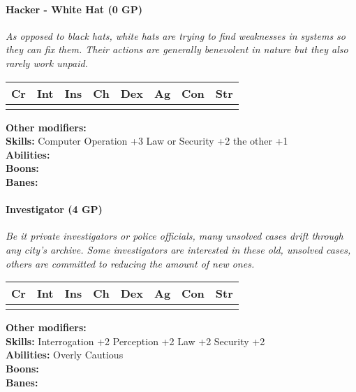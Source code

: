 \documentclass[12pt,a4paper,openany]{book}
\begin{document}
	\paragraph*{Hacker - White Hat (0 GP)}
	\textit{As opposed to black hats, white hats are trying to find weaknesses in systems so they can fix them. Their actions are generally benevolent in nature but they also rarely work unpaid.}\par
	\begin{tabular}{|l|l|l|l|l|l|l|l|}
		\hline
		Cr & Int & Ins & Ch & Dex & Ag & Con & Str \\ \hline
		&  &  &  &  &  &  &  \\ \hline
	\end{tabular}\par
	\noindent\textbf{Other modifiers:} \\
	\textbf{Skills:} Computer Operation +3
	Law or Security +2
	the other +1\\
	\textbf{Abilities:} \\
	\textbf{Boons:} \\
	\textbf{Banes:} \\
	
	\hrulefill
	\paragraph*{Investigator (4 GP)}
	\textit{Be it private investigators or police officials, many unsolved cases drift through any city's archive. Some investigators are interested in these old, unsolved cases, others are committed to reducing the amount of new ones.}\par
	\begin{tabular}{|l|l|l|l|l|l|l|l|}
		\hline
		Cr & Int & Ins & Ch & Dex & Ag & Con & Str \\ \hline
		&  &  &  &  &  &  &  \\ \hline
	\end{tabular}\par
	\noindent\textbf{Other modifiers:} \\
	\textbf{Skills:} Interrogation +2
	Perception +2
	Law +2
	Security +2\\
	\textbf{Abilities:} Overly Cautious\\
	\textbf{Boons:} \\
	\textbf{Banes:} \\
	
	\hrulefill
\end{document}

